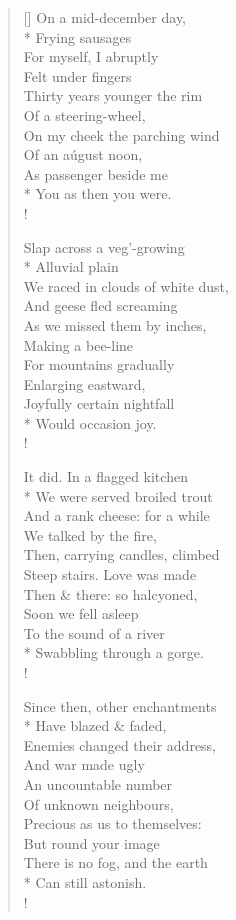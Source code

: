 \documentclass[MAIN]{subfiles}
\begin{document}
\settowidth{\versewidth}{On a mid-december day,}
\begin{verse}[\versewidth]
On a mid-december day,\\*
Frying sausages\\
For myself, I abruptly\\
Felt under fingers\\
Thirty years younger the rim\\
Of a steering-wheel,\\
On my cheek the parching wind\\
Of an a\'ugust noon,\\
As passenger beside me\\*
You as then you were.\\!

Slap across a veg'-growing\\*
Alluvial plain\\
We raced in clouds of white dust,\\
And geese fled screaming\\
As we missed them by inches,\\
Making a bee-line\\
For mountains gradually\\
Enlarging eastward,\\
Joyfully certain nightfall\\*
Would occasion joy.\\!

It did. In a flagged kitchen\\*
We were served broiled trout\\
And a rank cheese: for a while\\
We talked by the fire,\\
Then, carrying candles, climbed\\
Steep stairs. Love was made\\
Then \& there: so halcyoned,\\
Soon we fell asleep\\
To the sound of a river\\*
Swabbling through a gorge.\\!

Since then, other enchantments\\*
Have blazed \& faded,\\
Enemies changed their address,\\
And war made ugly\\
An uncountable number\\
Of unknown neighbours,\\
Precious as us to themselves:\\
But round your image\\
There is no fog, and the earth\\*
Can still astonish.\\!


\end{verse}
\end{document}
